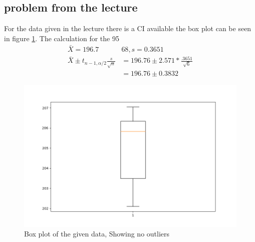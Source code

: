 \documentclass[12pt]{report}
\begin{document}
   \subsection*{problem from the lecture}
      For the data given in the lecture there is a CI available the box plot can be seen in figure \ref{fig:3}. The calculation for the 95%
   \begin{align*}
      \bar{X}=196.7&68,s= 0.3651\\
      \bar{X}\pm t_{n-1,\alpha/2}\frac{s}{\sqrt{n}}&=196.76 \pm 2.571*\frac{.3651}{\sqrt{6}}\\&=196.76 \pm 0.3832
   \end{align*}
   \begin{figure}[H]
	\begin{center}
		\includegraphics[width=.70\textwidth]{HW10boxplot.png}
	\end{center}
	\caption{Box plot of the given data, Showing no outliers}
   \label{fig:3}
\end{figure}
\end{document}
